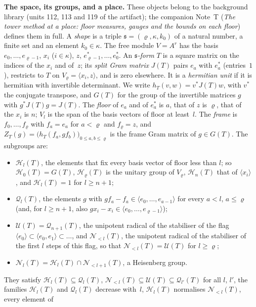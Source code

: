 \documentclass[11pt,a4paper]{article}
\newcommand{\subhead}[1]{\par\addvspace{9pt plus 2pt}\Needspace{4\baselineskip}\noindent\textbf{#1}\enspace\ignorespaces}
\theoremstyle{plainx}
\theoremstyle{uprightx}
\newcommand{\GT}[1]{G(#1)}
\newcommand{\JT}[1]{J(#1)}
\newcommand{\Hl}[2]{\mathcal{H}_{#1}(#2)}
\newcommand{\Ql}[2]{\mathcal{Q}_{#1}(#2)}
\newcommand{\Nb}[2]{\mathcal{N}_{<#1}(#2)}
\newcommand{\Nf}[2]{\mathcal{N}_{#1}(#2)}
\newcommand{\UT}[1]{\mathcal{U}(#1)}
\newcommand{\ZT}[2]{Z_{#1}(#2)}
\begin{document}
\subhead{The space, its groups, and a place.}\label{s:space} These objects belong to the background
library (units 112, 113 and 119 of the artifact); the companion Note~T (\emph{The tower method at a place: floor
measures, gauges and the bounds on each floor}) defines them in full. A \emph{shape} is a triple
$\mathfrak{s}=(\varrho,\kappa,k_0)$ of a natural number, a finite set and an element $k_0\in\kappa$. The free module
$V=A^{r}$ has the basis $e_0,\dots,e_{\varrho-1}$, $x_i$ ($i\in\kappa$), $z$, $e^*_{\varrho-1},\dots,e^*_0$. An
\emph{$\mathfrak{s}$-form} $T$ is a square matrix on the indices of the $x_i$ and of~$z$; its \emph{split Gram matrix}
$\JT{T}$ pairs $e_a$ with $e^*_a$ (entries~$1$), restricts to $T$ on $V_\varrho=\langle x_i,z\rangle$, and is zero
elsewhere. It is a \emph{hermitian unit} if it is hermitian with invertible determinant. We write
$h_T(v,w)=v^{*}\JT{T}w$, with $v^{*}$ the conjugate transpose, and $\GT{T}$ for the group of the invertible matrices
$g$ with $g^{*}\JT{T}g=\JT{T}$. The \emph{floor} of $e_a$ and of $e^*_a$ is $a$, that of $z$ is $\varrho$, that of
the $x_i$ is $n$; $V_l$ is the span of the basis vectors of floor at least~$l$. The \emph{frame} is
$f_0,\dots,f_\varrho$ with $f_a=e_a$ for $a<\varrho$ and $f_\varrho=z$, and
$\ZT{T}{g}=\bigl(h_T(f_a,gf_b)\bigr)_{0\le a,b\le\varrho}$ is the frame Gram matrix of $g\in\GT{T}$. The subgroups are:
\begin{itemize}
\item $\Hl{l}{T}$, the elements that fix every basis vector of floor less than $l$; so $\Hl{0}{T}=\GT{T}$,
  $\Hl{\varrho}{T}$ is the unitary group of $V_\varrho$, $\Hl{n}{T}$ that of $\langle x_i\rangle$, and
  $\Hl{l}{T}=1$ for $l\ge n+1$;
\item $\Ql{l}{T}$, the elements $g$ with $gf_a-f_a\in\langle e_0,\dots,e_{a-1}\rangle$ for every $a<l$, $a\le\varrho$
  (and, for $l\ge n+1$, also $gx_i-x_i\in\langle e_0,\dots,e_{\varrho-1}\rangle$);
\item $\UT{T}=\Ql{n+1}{T}$, the unipotent radical of the stabiliser of the flag
  $\langle e_0\rangle\subset\langle e_0,e_1\rangle\subset\dots$, and $\Nb{l}{T}$, the unipotent radical of the
  stabiliser of the first $l$ steps of this flag, so that $\Nb{l}{T}=\UT{T}$ for $l\ge\varrho$;
\item $\Nf{l}{T}=\Hl{l}{T}\cap\Nb{l+1}{T}$, a Heisenberg group.
\end{itemize}
They satisfy $\Hl{l}{T}\subseteq\Ql{l}{T}$, $\Nb{l}{T}\subseteq\UT{T}\subseteq\Ql{l'}{T}$ for all $l$, $l'$, the
families $\Hl{l}{T}$ and $\Ql{l}{T}$ decrease with~$l$, $\Hl{l}{T}$ normalises $\Nb{l}{T}$, every element of
\end{document}
